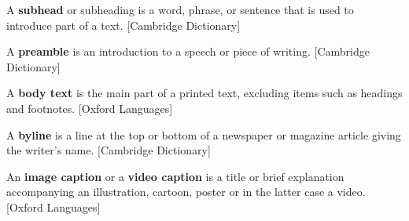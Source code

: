 \documentclass[oneside, english, bibtex]{kththesis}
\begin{document}
\begin{definition}
\label{subhead}
A \textbf{subhead} or subheading is a word, phrase, or sentence that is used to introduce part of a text. [Cambridge Dictionary]
\end{definition}

\begin{definition}
\label{preamble}
A \textbf{preamble} is an introduction to a speech or piece of writing. [Cambridge Dictionary]
\end{definition}

\begin{definition}
\label{body text}
A \textbf{body text} is the main part of a printed text, excluding items such as headings and footnotes. [Oxford Languages]
\end{definition}

\begin{definition}
\label{byline}
A \textbf{byline} is a line at the top or bottom of a newspaper or magazine article giving the writer's name. [Cambridge Dictionary]
\end{definition}

\begin{definition}
\label{img}
An \textbf{image caption} or a \textbf{video caption} is a title or brief explanation accompanying an illustration, cartoon, poster or in the latter case a video. [Oxford Languages]
\end{definition}

\label{pg:lastPageofMainmatter}

\clearpage
\fancyhead{}  %
\end{document}
